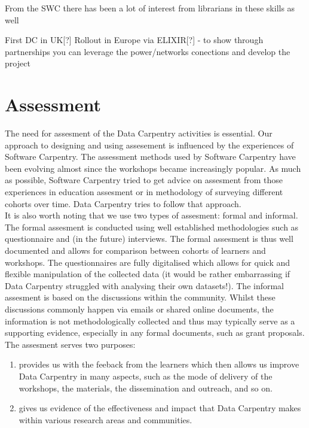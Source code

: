 \documentclass[15]{idcc}
\begin{document}
\begin{itemize}
From the SWC there has been a lot of interest from librarians in these skills as well

First DC in UK[?]
Rollout in Europe via ELIXIR[?] - to show through partnerships you can leverage the power/networks conections and develop the project

\section{Assessment}
The need for assesment of the Data Carpentry activities is essential. Our approach to designing and using assesement is influenced by
the experiences of Software Carpentry. The assessment methods used by Software Carpentry have been evolving almost since the workshops became 
increasingly popular. As much as possible, Software Carpentry tried to get advice on assesment from those experiences in education assesment or 
in methodology of surveying different cohorts over time. Data Carpentry tries to follow that approach. \\

It is also worth noting that we use two types of assesment: formal and informal. The formal assesment is conducted using well established 
methodologies such as questionnaire and (in the future) interviews. The formal assesment is thus well documented and allows for comparison
between cohorts of learners and workshops. The questionnaires are fully digitalised which allows for quick and flexible manipulation of the
collected data (it would be rather embarrassing if Data Carpentry struggled with analysing their own datasets!). The informal assesment is 
based on the discussions within the community. Whilst these discussions commonly happen via emails or shared online documents, the information
is not methodologically collected and thus may typically serve as a supporting evidence, especially in any formal documents, such as grant
proposals.\\

The assesment serves two purposes: 
\begin{enumerate}
\item provides us with the feeback from the learners which then allows us improve Data Carpentry in many aspects, such as the mode of
delivery of the workshops, the materials, the dissemination and outreach, and so on.
\item gives us evidence of the effectiveness and impact that Data Carpentry makes within various research areas and communities.
\end{enumerate}


\end{itemize}
\end{document}
